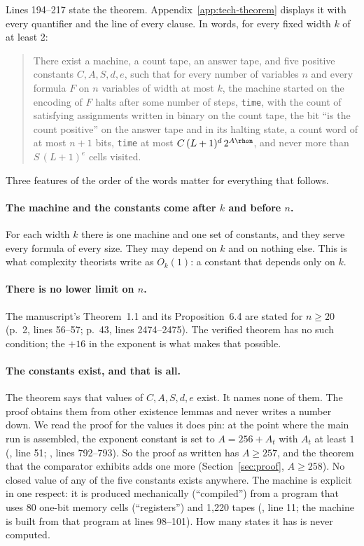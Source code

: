 Lines 194--217 state the theorem. Appendix~\ref{app:tech-theorem}
displays it with every quantifier and the line of every clause. In
words, for every fixed width $k$ of at least 2:

\begin{quote}
There exist a machine, a count tape, an answer tape, and five positive
constants $C, A, S, d, e$, such that for every number of variables $n$
and every formula $F$ on $n$ variables of width at most $k$, the
machine started on the encoding of $F$ halts after some number of steps,
\texttt{time}, with the count of satisfying assignments written in
binary on the count tape, the bit ``is the count positive'' on the
answer tape and in its halting state, a count word of at most $n + 1$
bits, \texttt{time} at most $C\,(L+1)^d\,2^{A\rhon}$, and never more
than $S\,(L+1)^e$ cells visited.
\end{quote}

Three features of the order of the words matter for everything that
follows.

\paragraph{The machine and the constants come after $k$ and before $n$.}
For each width $k$ there is one machine and one set of constants, and
they serve every formula of every size. They may depend on $k$ and on
nothing else. This is what complexity theorists write as $O_k(1)$: a
constant that depends only on $k$.

\paragraph{There is no lower limit on $n$.}
The manuscript's Theorem~1.1 and its Proposition~6.4 are stated for
$n \ge 20$ (p.~2, lines 56--57; p.~43, lines 2474--2475). The verified
theorem has no such condition; the $+16$ in the exponent is what makes
that possible.

\paragraph{The constants exist, and that is all.}
The theorem says that values of $C, A, S, d, e$ exist. It names none
of them. The proof obtains them from other existence lemmas and never writes a number down. We read the proof for the values it does pin:
at the point where the main run is assembled, the exponent constant is
set to $A = 256 + A_t$ with $A_t$ at least $1$
(, line 51;
, lines 792--793). So
the proof as written has $A \ge 257$, and the theorem that the
comparator exhibits adds one more
(Section~\ref{sec:proof}, $A \ge 258$). No closed value of any of the
five constants exists anywhere. The machine is explicit in one respect:
it is produced mechanically (``compiled'') from a program that uses 80 one-bit memory cells (``registers'') and 1,220 tapes
(, line 11; the machine is built from
that program at lines 98--101). How many states it
has is never computed.


